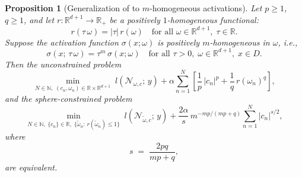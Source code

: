 \documentclass[12pt,fleqn]{amsart}
\newtheorem{proposition}[theorem]{Proposition}
\theoremstyle{definition}
\begin{document}
\begin{proposition}[Generalization of {\cite[Proposition~3]{pieper2022nonconvex}} to $m$-homogeneous activations]
	Let $p \geq 1$, $q \geq 1$, and let $r \colon \mathbb{R}^{d+1} \to \mathbb{R}_+$ be a positively $1$-homogeneous functional:
	\[
	  r(\tau\,\omega) = |\tau|\, r(\omega) \quad \text{for all } \omega \in \mathbb{R}^{d+1},\; \tau \in \mathbb{R}.
	\]
	Suppose the activation function $\sigma(x;\omega)$ is positively $m$-homogeneous in $\omega$, i.e.,
	\[
	  \sigma(x;\, \tau\,\omega) = \tau^m\, \sigma(x;\omega) \quad \text{for all } \tau > 0,\; \omega \in \mathbb{R}^{d+1},\; x \in D.
	\]
	Then the unconstrained problem
	\begin{equation*}
	  \min_{N \in \mathbb{N},\; (c_n, \omega_n) \in \mathbb{R} \times \mathbb{R}^{d+1}}
	  \; l(\mathcal{N}_{\omega,c};\, y)
	  + \alpha \sum_{n=1}^{N} \left[ \frac{1}{p}\,|c_n|^p + \frac{1}{q}\,r(\omega_n)^q \right],
	\end{equation*}
	and the sphere-constrained problem
	\begin{equation*}
	  \min_{N \in \mathbb{N},\; \{c_n\} \in \mathbb{R},\; \{\tilde\omega_n:\, r(\tilde\omega_n) \leq 1\}}
	  \; l(\mathcal{N}_{\tilde\omega,c};\, y)
	  + \frac{2\alpha}{s}\, m^{-mp/(mp+q)} \sum_{n=1}^{N} |c_n|^{s/2},
	\end{equation*}
	where
	\[
	  s \;=\; \frac{2pq}{mp + q},
	\]
	are equivalent.
\end{proposition}
  
\end{document}
